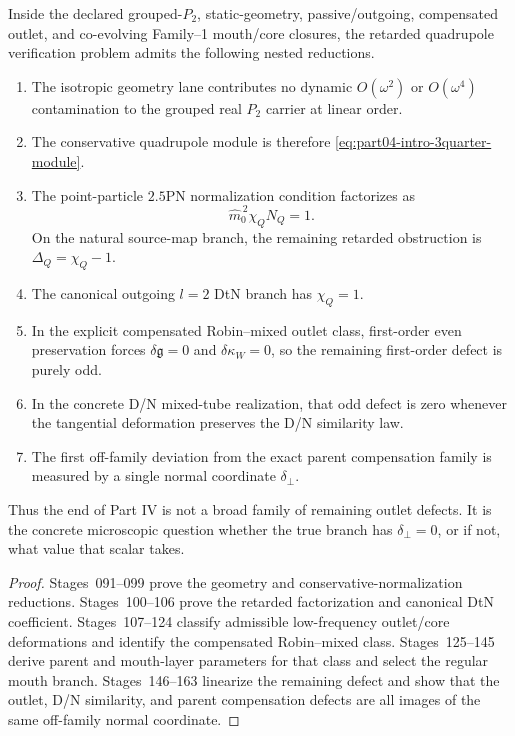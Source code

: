 \begin{theorem}
\label{thm:part04-reduced-retarded-compression}
Inside the declared grouped-\(P_2\), static-geometry, passive/outgoing, compensated outlet, and co-evolving Family--1 mouth/core closures, the retarded quadrupole verification problem admits the following nested reductions.
\begin{enumerate}[leftmargin=2.2em]
\item The isotropic geometry lane contributes no dynamic \(O(\omega^2)\) or \(O(\omega^4)\) contamination to the grouped real \(P_2\) carrier at linear order.
\item The conservative quadrupole module is therefore \eqref{eq:part04-intro-3quarter-module}.
\item The point-particle \(2.5\)PN normalization condition factorizes as
\begin{equation}
\label{eq:part04-main-factorization}
\widehat m_0^{\,2}\chi_Q N_Q=1.
\end{equation}
On the natural source-map branch, the remaining retarded obstruction is \(\Delta_Q=\chi_Q-1\).
\item The canonical outgoing \(l=2\) DtN branch has \(\chi_Q=1\).
\item In the explicit compensated Robin--mixed outlet class, first-order even preservation forces \(\delta\mathfrak g=0\) and \(\delta\kappa_W=0\), so the remaining first-order defect is purely odd.
\item In the concrete D/N mixed-tube realization, that odd defect is zero whenever the tangential deformation preserves the D/N similarity law.
\item The first off-family deviation from the exact parent compensation family is measured by a single normal coordinate \(\delta_\perp\).
\end{enumerate}
Thus the end of Part IV is not a broad family of remaining outlet defects.  It is the concrete microscopic question whether the true branch has \(\delta_\perp=0\), or if not, what value that scalar takes.
\end{theorem}

\begin{proof}
Stages~091--099 prove the geometry and conservative-normalization reductions.  Stages~100--106 prove the retarded factorization and canonical DtN coefficient.  Stages~107--124 classify admissible low-frequency outlet/core deformations and identify the compensated Robin--mixed class.  Stages~125--145 derive parent and mouth-layer parameters for that class and select the regular mouth branch.  Stages~146--163 linearize the remaining defect and show that the outlet, D/N similarity, and parent compensation defects are all images of the same off-family normal coordinate.
\end{proof}

